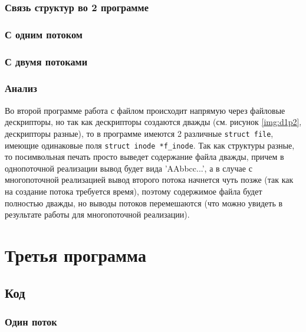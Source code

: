 \subsection{Связь структур во 2 программе}


\subsection{С одним потоком}


\subsection{С двумя потоками}


\subsection{Анализ}

Во второй программе работа с файлом происходит напрямую через файловые дескрипторы, но так как дескрипторы создаются дважды (см. рисунок \ref{img:d1p2}, дескрипторы разные), то в программе имеются 2 различные \texttt{struct file}, имеющие одинаковые поля \texttt{struct inode *f\_inode}. Так как структуры разные, то посимвольная печать просто выведет содержание файла дважды, причем в однопоточной реализации вывод будет вида 'AAbbcc...', а в случае с многопоточной реализацией вывод второго потока начнется чуть позже (так как на создание потока требуется время), поэтому содержимое файла будет полностью дважды, но выводы потоков перемешаются (что можно увидеть в результате работы для многопоточной реализации).


\chapter{Третья программа}

\section{Код}

\subsection{Один поток}

